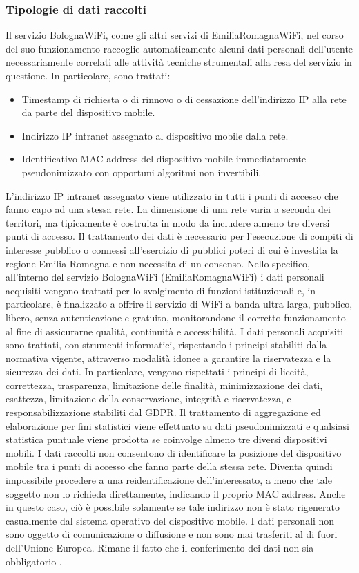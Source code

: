 \subsubsection{Tipologie di dati raccolti}
Il servizio BolognaWiFi, come gli altri servizi di EmiliaRomagnaWiFi, nel corso del suo funzionamento raccoglie automaticamente alcuni dati personali dell'utente necessariamente correlati alle attività tecniche strumentali alla resa del servizio in questione. In particolare, sono trattati:
\begin{itemize}
    \item Timestamp di richiesta o di rinnovo o di cessazione dell'indirizzo IP alla rete da parte del dispositivo mobile.
    \item Indirizzo IP intranet assegnato al dispositivo mobile dalla rete.
    \item Identificativo MAC address del dispositivo mobile immediatamente pseudonimizzato con opportuni algoritmi non invertibili.
\end{itemize}
L'indirizzo IP intranet assegnato viene utilizzato in tutti i punti di accesso che fanno capo ad una stessa rete. La dimensione di una rete varia a seconda dei territori, ma tipicamente è costruita in modo da includere almeno tre diversi punti di accesso.
Il trattamento dei dati è necessario per l'esecuzione di compiti di interesse pubblico o connessi all'esercizio di pubblici poteri di cui è investita la regione Emilia-Romagna e non necessita di un consenso. Nello specifico, all'interno del servizio BolognaWiFi (EmiliaRomagnaWiFi) i dati personali acquisiti vengono trattati per lo svolgimento di funzioni istituzionali e, in particolare, è finalizzato a offrire il servizio di WiFi a banda ultra larga, pubblico, libero, senza autenticazione e gratuito, monitorandone il corretto funzionamento al fine di assicurarne qualità, continuità e accessibilità.
I dati personali acquisiti sono trattati, con strumenti informatici, rispettando i principi stabiliti dalla normativa vigente, attraverso modalità idonee a garantire la riservatezza e la sicurezza dei dati. In particolare, vengono rispettati i principi di liceità, correttezza, trasparenza, limitazione delle finalità, minimizzazione dei dati, esattezza, limitazione della conservazione, integrità e riservatezza, e responsabilizzazione stabiliti dal GDPR. Il trattamento di aggregazione ed elaborazione per fini statistici viene effettuato su dati pseudonimizzati e qualsiasi statistica puntuale viene prodotta se coinvolge almeno tre diversi dispositivi mobili. I dati raccolti non consentono di identificare la posizione del dispositivo mobile tra i punti di accesso che fanno parte della stessa rete. Diventa quindi impossibile procedere a una reidentificazione dell'interessato, a meno che tale soggetto non lo richieda direttamente, indicando il proprio MAC address. Anche in questo caso, ciò è possibile solamente se tale indirizzo non è stato rigenerato casualmente dal sistema operativo del dispositivo mobile. I dati personali non sono oggetto di comunicazione o diffusione e non sono mai trasferiti al di fuori dell'Unione Europea. Rimane il fatto che il conferimento dei dati non sia obbligatorio \cite{Informativa_EmiliaRomagnaWiFi}.

